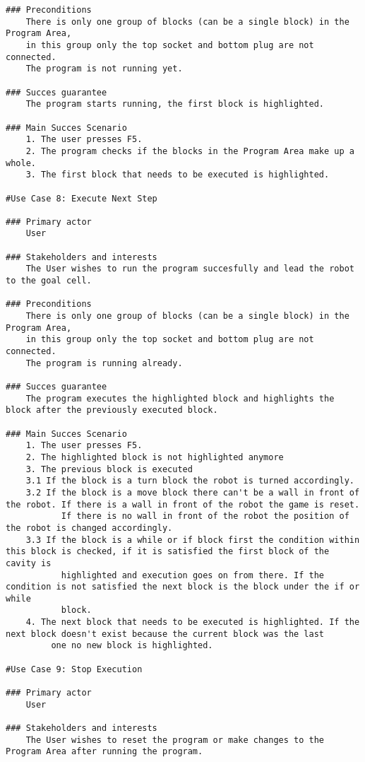 \documentclass{article}
\begin{document}
\begin{verbatim}
### Preconditions
    There is only one group of blocks (can be a single block) in the Program Area, 
    in this group only the top socket and bottom plug are not connected.
    The program is not running yet.

### Succes guarantee
    The program starts running, the first block is highlighted.

### Main Succes Scenario
    1. The user presses F5.
    2. The program checks if the blocks in the Program Area make up a whole.
    3. The first block that needs to be executed is highlighted.

#Use Case 8: Execute Next Step

### Primary actor
    User
    
### Stakeholders and interests
    The User wishes to run the program succesfully and lead the robot to the goal cell.

### Preconditions
    There is only one group of blocks (can be a single block) in the Program Area, 
    in this group only the top socket and bottom plug are not connected.
    The program is running already.

### Succes guarantee
    The program executes the highlighted block and highlights the block after the previously executed block.

### Main Succes Scenario
    1. The user presses F5.
    2. The highlighted block is not highlighted anymore
    3. The previous block is executed
    3.1 If the block is a turn block the robot is turned accordingly.
    3.2 If the block is a move block there can't be a wall in front of the robot. If there is a wall in front of the robot the game is reset. 
           If there is no wall in front of the robot the position of the robot is changed accordingly. 
    3.3 If the block is a while or if block first the condition within this block is checked, if it is satisfied the first block of the cavity is 
           highlighted and execution goes on from there. If the condition is not satisfied the next block is the block under the if or while
           block.
    4. The next block that needs to be executed is highlighted. If the next block doesn't exist because the current block was the last
         one no new block is highlighted.

#Use Case 9: Stop Execution

### Primary actor
    User
    
### Stakeholders and interests
    The User wishes to reset the program or make changes to the Program Area after running the program.


\end{verbatim}
\end{document}
